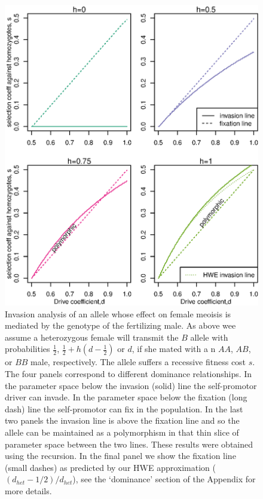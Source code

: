 \documentclass[12pt,letterpaper]{article}
\begin{document}
\begin{figure}
\includegraphics[width = 0.8 \textwidth]{../Scripts/effect_of_dominance_on_invasion_space_four_graph.eps} 
\caption{Invasion analysis of an allele whose effect
 on female meoisis is mediated by the genotype of the fertilizing
 male.  As above wee assume a heterozygous female will transmit the $B$ allele 
  with probabilities  $\frac{1}{2}$,  $\frac{1}{2} + h(d-\frac{1}{2}) $ or $d$, 
 if she mated with a n $AA$, $AB$, or $BB$ male,  respectively.  The allele suffers a recessive fitness cost $s$.  
 The four panels correspond to different dominance relationships.
In the parameter space below the invasion (solid) line the self-promotor
 driver can invade. In the parameter space below the fixation (long
 dash) line the self-promotor can fix in the population. In the last
 two panels the invasion line is above the fixation line and so the
 allele can be maintained as a polymorphism in that thin slice of
 parameter space between the two lines. These results were 
  obtained using the recursion. In the final panel we show the
  fixation line (small dashes) as predicted by our HWE approximation
  ($(d_{het}-1/2)/d_{het}$), see the `dominance' section of the
  Appendix for more details.
}  \label{Effect_of_dominance}
\end{figure}
\end{document}
